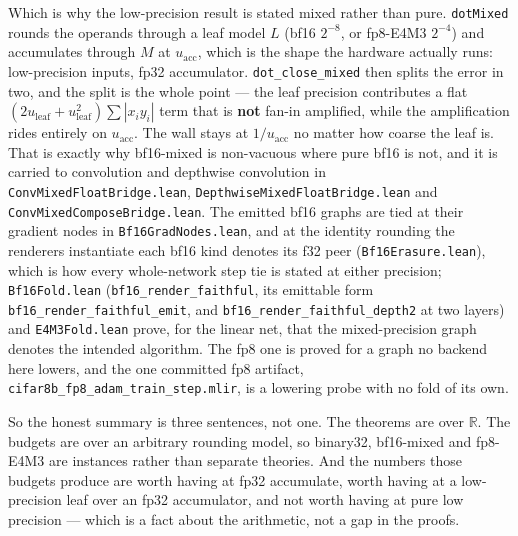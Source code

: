 \medskip\noindent Which is why the low-precision result is stated
mixed rather than pure. \texttt{dotMixed} rounds the operands
through a leaf model \(L\) (bf16 \(2^{-8}\), or fp8-E4M3 \(2^{-4}\)) and
accumulates through \(M\) at \(u_{\mathrm{acc}}\), which is the shape the
hardware actually runs: low-precision inputs, fp32 accumulator.
\texttt{dot\_close\_mixed} then splits the error in two, and the split is
the whole point --- the leaf precision contributes a flat
\((2u_{\mathrm{leaf}} + u_{\mathrm{leaf}}^2)\sum|x_i y_i|\) term that is
\textbf{not} fan-in amplified, while the amplification rides entirely on
\(u_{\mathrm{acc}}\). The wall stays at \(1/u_{\mathrm{acc}}\) no matter
how coarse the leaf is. That is exactly why bf16-mixed is non-vacuous
where pure bf16 is not, and it is carried to convolution and depthwise
convolution in \texttt{ConvMixedFloatBridge.lean},
\texttt{DepthwiseMixedFloatBridge.lean} and
\texttt{ConvMixedComposeBridge.lean}. The emitted bf16 graphs are tied at
their gradient nodes in \texttt{Bf16GradNodes.lean}, and at the identity
rounding the renderers instantiate each bf16 kind denotes its f32 peer
(\texttt{Bf16Erasure.lean}), which is how every whole-network step tie is
stated at either precision; \texttt{Bf16Fold.lean}
(\texttt{bf16\_render\_faithful}, its emittable form
\texttt{bf16\_render\_faithful\_emit}, and \texttt{bf16\_render\_faithful\_depth2}
at two layers) and \texttt{E4M3Fold.lean} prove, for the linear net, that the mixed-precision
graph denotes the intended algorithm. The fp8 one is proved for a graph no
backend here lowers, and the one committed fp8 artifact,
\texttt{cifar8b\_fp8\_adam\_train\_step.mlir}, is a lowering probe with no
fold of its own.

\medskip\noindent So the honest summary is three sentences, not one. The
theorems are over \(\mathbb{R}\). The budgets are over an arbitrary
rounding model, so binary32, bf16-mixed and fp8-E4M3 are instances rather
than separate theories. And the numbers those budgets produce are worth
having at fp32 accumulate, worth having at a low-precision leaf over an
fp32 accumulator, and not worth having at pure low precision --- which is
a fact about the arithmetic, not a gap in the proofs.

